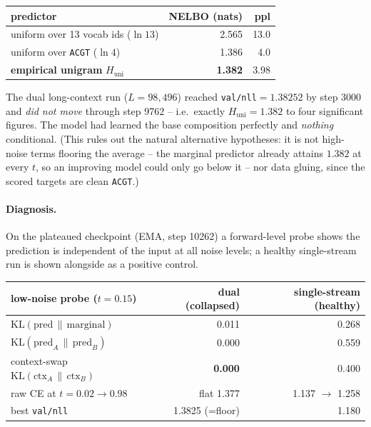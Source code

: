 \documentclass[11pt,a4paper]{article}
\begin{document}
\begin{table}[h]
\centering
\begin{tabular}{l r r}
\toprule
predictor & NELBO (nats) & ppl \\
\midrule
uniform over 13 vocab ids (\(\ln 13\))         & 2.565 & 13.0 \\
uniform over \texttt{ACGT} (\(\ln 4\))         & 1.386 & 4.0 \\
\textbf{empirical unigram} \(H_{\text{uni}}\)  & \textbf{1.382} & 3.98 \\
\bottomrule
\end{tabular}
\end{table}

\noindent The dual long-context run (\(L=98{,}496\)) reached
\texttt{val/nll}\(=1.38252\) by step 3000 and \emph{did not move} through step
9762 -- i.e.\ exactly \(H_{\text{uni}}=1.382\) to four significant figures. The
model had learned the base composition perfectly and \emph{nothing} conditional.
(This rules out the natural alternative hypotheses: it is not high-noise terms
flooring the average -- the marginal predictor already attains \(1.382\) at every
\(t\), so an improving model could only go below it -- nor data gluing, since the
scored targets are clean \texttt{ACGT}.)

\paragraph{Diagnosis.} On the plateaued checkpoint (EMA, step 10262) a
forward-level probe shows the prediction is independent of the input at all noise
levels; a healthy single-stream run is shown alongside as a positive control.

\begin{table}[h]
\centering
\begin{tabular}{l r r}
\toprule
low-noise probe (\(t=0.15\)) & dual (collapsed) & single-stream (healthy) \\
\midrule
\(\mathrm{KL}(\text{pred}\,\|\,\text{marginal})\)             & 0.011       & 0.268 \\
\(\mathrm{KL}(\text{pred}_A\,\|\,\text{pred}_B)\)             & 0.000       & 0.559 \\
context-swap \(\mathrm{KL}(\text{ctx}_A\,\|\,\text{ctx}_B)\)  & \textbf{0.000} & 0.400 \\
raw CE at \(t=0.02 \to 0.98\)                                 & flat 1.377  & 1.137 \(\to\) 1.258 \\
best \texttt{val/nll}                                         & 1.3825 (=floor) & 1.180 \\
\bottomrule
\end{tabular}
\end{table}
\end{document}
